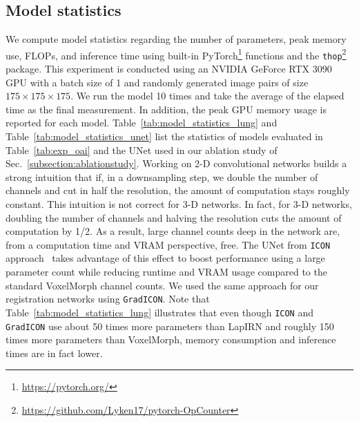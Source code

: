 \subsection{Model statistics}\label{sec:model_statistics}
We compute model statistics regarding the number of parameters, peak memory
use, FLOPs, and inference time using built-in
PyTorch\footnote{\url{https://pytorch.org/}} functions and the
\texttt{thop}\footnote{\url{https://github.com/Lyken17/pytorch-OpCounter}}
package. This experiment is conducted using an NVIDIA GeForce RTX 3090 GPU
with a batch size of 1 and randomly generated image pairs of size
$175\times175\times175$. We run the model 10 times and take the average of the
elapsed time as the final measurement. In addition, the peak GPU memory usage
is reported for each model. Table~\ref{tab:model_statistics_lung} and
Table~\ref{tab:model_statistics_unet} list the statistics of models evaluated
in Table~\ref{tab:exp_oai} and the UNet used in our ablation study of
Sec.~\ref{subsection:ablationstudy}. Working on 2-D convolutional networks
builds a strong intuition that if, in a downsampling step, we double the
number of channels and cut in half the resolution, the amount of computation
stays roughly constant. This intuition is not correct for 3-D networks. In
fact, for 3-D networks, doubling the number of channels and halving the
resolution cuts the amount of computation by 1/2. As a result, large channel
counts deep in the network are, from a computation time and VRAM perspective,
free. The UNet from \texttt{ICON} approach~\cite{greer2021icon} takes
advantage of this effect to boost performance using a large parameter count
while reducing runtime and VRAM usage compared to the standard VoxelMorph
channel counts. We used the same approach for our registration networks using
\texttt{GradICON}. Note that Table~\ref{tab:model_statistics_lung} illustrates
that even though \texttt{ICON} and \texttt{GradICON} use about 50 times more
parameters than LapIRN and roughly 150 times more parameters than VoxelMorph,
memory consumption and inference times are in fact lower.
